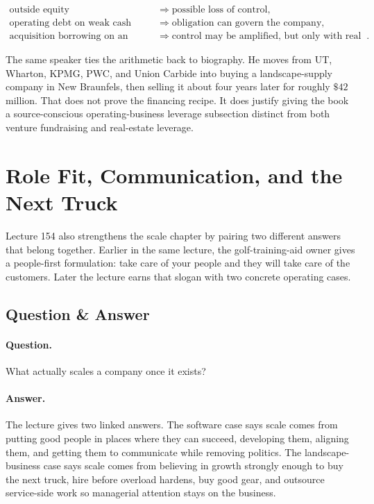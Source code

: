 \documentclass[11pt,oneside]{book}
\begin{document}
\begin{align}
\text{outside equity} &\Rightarrow \text{possible loss of control},\\
\text{operating debt on weak cash flow} &\Rightarrow \text{obligation can govern the company},\\
\text{acquisition borrowing on an existing business} &\Rightarrow \text{control may be amplified, but only with real execution risk}.
\end{align}

The same speaker ties the arithmetic back to biography. He moves from UT, Wharton, KPMG, PWC, and Union Carbide into buying a landscape-supply company in New Braunfels, then selling it about four years later for roughly \(\$42\) million. That does not prove the financing recipe. It does justify giving the book a source-conscious operating-business leverage subsection distinct from both venture fundraising and real-estate leverage.

\section{Role Fit, Communication, and the Next Truck}

Lecture 154 also strengthens the scale chapter by pairing two different answers that belong together. Earlier in the same lecture, the golf-training-aid owner gives a people-first formulation: take care of your people and they will take care of the customers. Later the lecture earns that slogan with two concrete operating cases.

\subsection{Question \& Answer}

\paragraph{Question.}
What actually scales a company once it exists?

\paragraph{Answer.}
The lecture gives two linked answers. The software case says scale comes from putting good people in places where they can succeed, developing them, aligning them, and getting them to communicate while removing politics. The landscape-business case says scale comes from believing in growth strongly enough to buy the next truck, hire before overload hardens, buy good gear, and outsource service-side work so managerial attention stays on the business.
\end{document}
